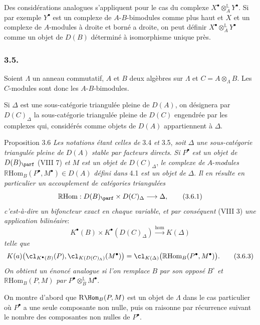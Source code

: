 Des considérations analogues s'appliquent pour le cas du complexe $X^\bullet\otimes_A^{\mathbb{L}}Y^\bullet$. Si par exemple $Y^\bullet$ est un complexe de $A$-$B$-bimodules comme plus haut et $X$ et un complexe de $A$-modules à droite et borné a droite, on peut définir $X^\bullet\otimes_A^{\mathbb{L}}Y^\bullet$ comme un objet de $D(B)$ déterminé à isomorphisme unique près.

\subsubsection*{3.5.}

Soient $\Lambda$ un anneau commutatif, $A$ et $B$ deux algèbres sur $\Lambda$ et
$C=A\otimes_{\Lambda}B$. Les $C$-modules sont donc les $A$-$B$-bimodules.

Si $\Delta$ est une sous-catégorie triangulée pleine de $D(A)$, on désignera par $D(C)_{\Delta}$ la sous-catégorie triangulée pleine de $D(C)$ engendrée par les complexes qui, considérés comme objets de $D(A)$ appartiennent à $\Delta$.

\begin{statement}{Proposition 3.6}
\emph{Les notations étant celles de} 3.4 \emph{et} 3.5, \emph{soit} $\Delta$ \emph{une sous-catégorie triangulée pleine de} $D(A)$ \emph{stable par facteurs directs}. \emph{Si} $P^\bullet$ \emph{est un objet de} $D(B)_{\parf}$ (VIII 7) \emph{et} $M$ \emph{est un objet de} $D(C)_{\Delta}$, \emph{le complexe de} $A$-\emph{modules} $\mathbb{R}\mathrm{Hom}_B(P^\bullet,M^\bullet)\in D(A)$ \emph{défini dans} 4.1 \emph{est un objet de} $\Delta$. \emph{Il en résulte en particulier un accouplement de catégories triangulées}
\[
\mathbb{R}\mathrm{Hom}:D(B)_{\parf}\times D(C)_{\Delta}\longrightarrow \Delta,
\tag{3.6.1}
\]
\emph{c'est-à-dire un bifoncteur exact en chaque variable}, \emph{et par conséquent} (VIII 3) \emph{une application bilinéaire}:
\[
K^{\bullet}(B)\times K^{\bullet}(D(C)_{\Delta})\xrightarrow{\operatorname{hom}} K(\Delta)
\tag{3.6.2}
\]
\emph{telle que}
\[
K(a)\bigl(\cl_{K^{\bullet}(B)}(P),\cl_{K(D(C)_{\Lambda})}(M^\bullet)\bigr)
=\cl_{K(\Delta)}\bigl(\mathbb{R}\mathrm{Hom}_B(P^\bullet,M^\bullet)\bigr).
\tag{3.6.3}
\]
\emph{On obtient un énoncé analogue si l'on remplace} $B$ \emph{par son opposé} $B^\circ$ \emph{et} $\mathbb{R}\mathrm{Hom}_B(P,M)$ \emph{par} $P^\bullet\otimes_B^{\mathbb{L}}M^\bullet$.
\end{statement}

\begin{prooftext}[Démonstration]
On montre d'abord que $\mathrm{R}\Hom_B(P,M)$ est un objet de $\Lambda$ dans le cas particulier où $P^\bullet$ a une seule composante non nulle, puis on raisonne par récurrence suivant le nombre des composantes non nulles de $P^\bullet$.
\end{prooftext}


